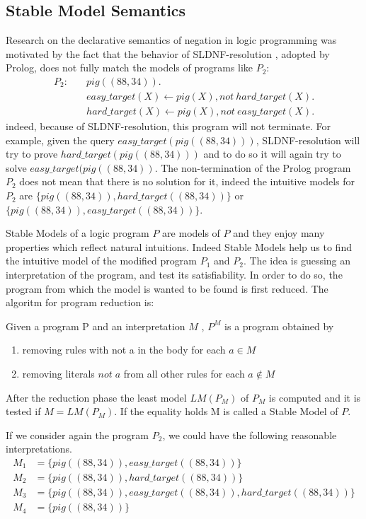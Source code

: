 \subsection{Stable Model Semantics}
Research on the declarative semantics of negation in logic programming was motivated by the fact that the behavior of SLDNF-resolution \cite{}, adopted by Prolog,  does not fully match the models of programs like \(P_2\):
\begin{align}
  P_2 \colon \quad
&\mathit{pig}((88,34)). \\
&\mathit{easy\_target}(X) \leftarrow pig(X), not\: \mathit{hard\_target}(X). \label{eq:3}\\ 
&\mathit{hard\_target}(X) \leftarrow pig(X), not\: \mathit{easy\_target}(X). \label{eq:4}
\end{align}
indeed, because of SLDNF-resolution, this program will not terminate. For example, given the query \(\mathit{easy\_target}(pig((88,34)))\), SLDNF-resolution will try to prove \(\mathit{hard\_target}(pig((88,34)))\) and to do so it will again try to solve \(\mathit{easy\_target}(pig((88,34))\).
The non-termination of the Prolog program \(P_2\) does not mean that there is no solution for it, indeed the intuitive models for \(P_2\) are \(\{pig((88,34)), \mathit{hard\_target}((88,34))\}\) or  \(\{pig((88,34)), \mathit{easy\_target}((88,34))\}\).

Stable Models of a logic program \(P\) are models of \(P\) and they enjoy many properties which reflect natural intuitions.
Indeed  Stable Models help us to find the intuitive model of the modified program \(P_1\) and \(P_2\). The idea is guessing an interpretation of the program, and test its satisfiability. In order to do so, the program from which the model is wanted to be found is first reduced. The algoritm for program reduction is:

Given a program P and an interpretation \(M\) , \(P^M\) is a program obtained by 
\begin{enumerate} 
\item removing rules with not a in the body for each \(a \in M\)
\item removing literals \(not\; a\) from all other rules for each \(a \notin M\)
\end{enumerate}
After the reduction phase the least model \(LM(P_M)\) of \(P_M\) is computed and it is tested if \(M = LM(P_M)\). If the equality holds M is called a Stable Model of \(P\).

If we consider again the program \(P_2\), we could have the following reasonable interpretations.
\begin{align*}
M_1&= \{pig((88,34)), \mathit{easy\_target}((88,34))\}  \\
M_2&= \{pig((88,34)), \mathit{hard\_target}((88,34))\} \\
M_3&= \{pig((88,34)), \mathit{easy\_target}((88,34)), \mathit{hard\_target}((88,34))\} \\
M_4&= \{pig((88,34))\}
\end{align*}

